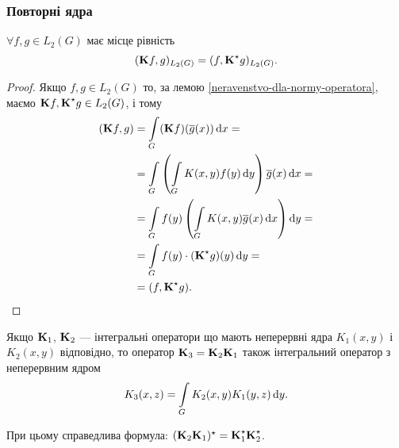 \allowbreak

\subsubsection{Повторні ядра}

\begin{proposition}
	$\forall f, g \in L_2(G)$ має місце рівність 
	\begin{equation}
		(\bf{K}f,g)_{L_2(G)} = (f, \bf{K}^\star g)_{L_2(G)}.
	\end{equation}
\end{proposition}

\begin{proof}
	Якщо $f, g \in L_2(G)$ то, за лемою \ref{neravenstvo-dla-normy-operatora}, маємо $\bf{K}f, \bf{K}^\star g \in L_2(G)$, і тому
	\begin{equation}
		\begin{aligned}
			(\bf{K}f, g) &= \Int_G (\bf{K}f)(\overline g(x)) \diff x = \\
			&= \Int_G \left( \Int_G K(x, y) f(y) \diff y\right) \overline{g}(x) \diff x = \\
			&= \Int_G f(y) \left( \Int_G K(x, y) \overline g(x) \diff x\right) \diff y = \\
			&= \Int_G f(y) \cdot (\bf{K}^\star  g)(y) \diff y = \\
			&= (f, \bf{K}^\star g).
		\end{aligned}
	\end{equation}
\end{proof}

\begin{lemma}
	Якщо $\bf{K}_1$, $\bf{K}_2$ --- інтегральні оператори що мають неперервні ядра $K_1(x, y)$ і $K_2(x, y)$ відповідно, то оператор $\bf{K}_3 = \bf{K}_2 \bf{K}_1$ також інтегральний оператор з неперервним ядром
	\begin{equation}
		K_3(x, z) = \Int_G K_2(x, y) K_1(y, z) \diff y.
	\end{equation}
\end{lemma}

\begin{remark}
	При цьому справедлива формула: $(\bf{K}_2 \bf{K}_1)^\star = \bf{K}_1^\star \bf{K}_2^\star$.
\end{remark}

